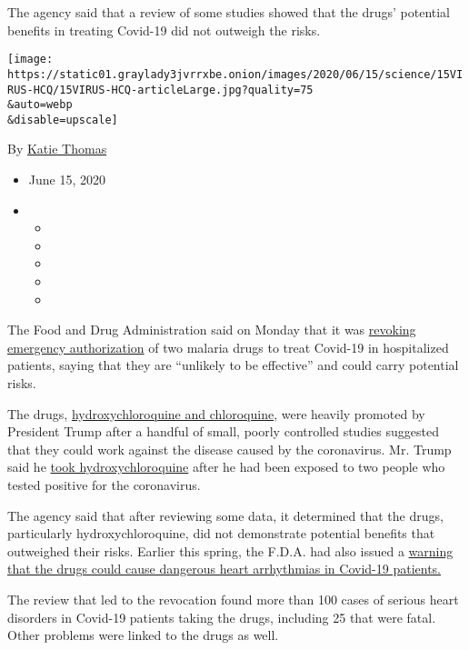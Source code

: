 The agency said that a review of some studies showed that the drugs'
potential benefits in treating Covid-19 did not outweigh the risks.

\texttt{[image: https://static01.graylady3jvrrxbe.onion/images/2020/06/15/science/15VIRUS-HCQ/15VIRUS-HCQ-articleLarge.jpg?quality=75\\\&auto=webp\\\&disable=upscale]}

By \href{https://www.nytimes3xbfgragh.onion/by/katie-thomas}{Katie
Thomas}

\begin{itemize}
\item
  June 15, 2020
\item
  \begin{itemize}
  \item
  \item
  \item
  \item
  \item
  \end{itemize}
\end{itemize}

The Food and Drug Administration said on Monday that it was
\href{https://www.fda.gov/media/138945/download}{revoking emergency
authorization} of two malaria drugs to treat Covid-19 in hospitalized
patients, saying that they are ``unlikely to be effective'' and could
carry potential risks.

The drugs,
\href{https://www.nytimes3xbfgragh.onion/2020/06/20/health/hydroxychloroquine-coronavirus-trial.html}{hydroxychloroquine
and chloroquine}, were heavily promoted by President Trump after a
handful of small, poorly controlled studies suggested that they could
work against the disease caused by the coronavirus. Mr. Trump said he
\href{https://www.nytimes3xbfgragh.onion/2020/06/03/us/politics/trump-physical-hydroxychloroquine.html}{took
hydroxychloroquine} after he had been exposed to two people who tested
positive for the coronavirus.

The agency said that after reviewing some data, it determined that the
drugs, particularly hydroxychloroquine, did not demonstrate potential
benefits that outweighed their risks. Earlier this spring, the F.D.A.
had also issued a
\href{https://www.nytimes3xbfgragh.onion/2020/04/24/health/fda-hydroxychloroquine-coronavirus.html}{warning
that the drugs could cause dangerous heart arrhythmias in Covid-19
patients.}

The review that led to the revocation found more than 100 cases of
serious heart disorders in Covid-19 patients taking the drugs, including
25 that were fatal. Other problems were linked to the drugs as well.

